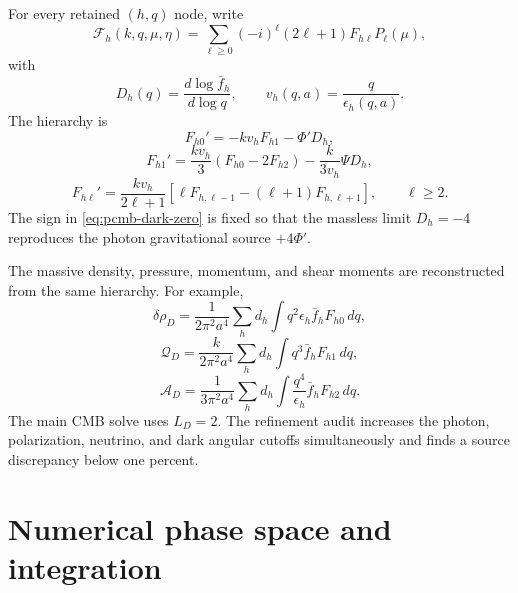 For every retained $(h,q)$ node, write
\begin{equation}
 \mathcal F_h(k,q,\mu,\eta)
 =\sum_{\ell\geq0}(-i)^\ell(2\ell+1)F_{h\ell}P_\ell(\mu),
 \label{eq:pcmb-dark-multipole-expansion}
\end{equation}
with
\begin{equation}
 D_h(q)=\frac{d\log\bar f_h}{d\log q},
 \qquad
 v_h(q,a)=\frac{q}{\epsilon_h(q,a)}.
 \label{eq:pcmb-dark-velocity-slope}
\end{equation}
The hierarchy is
\begin{equation}
 F_{h0}'=-kv_hF_{h1}-\Phi'D_h,
 \label{eq:pcmb-dark-zero}
\end{equation}
\begin{equation}
 F_{h1}'
 =\frac{kv_h}{3}(F_{h0}-2F_{h2})
 -\frac{k}{3v_h}\Psi D_h,
 \label{eq:pcmb-dark-one}
\end{equation}
\begin{equation}
 F_{h\ell}'
 =\frac{kv_h}{2\ell+1}
 \left[\ell F_{h,\ell-1}-(\ell+1)F_{h,\ell+1}\right],
 \qquad \ell\geq2.
 \label{eq:pcmb-dark-general}
\end{equation}
The sign in \eqref{eq:pcmb-dark-zero} is fixed so that the massless limit $D_h=-4$ reproduces the photon gravitational source $+4\Phi'$.

The massive density, pressure, momentum, and shear moments are reconstructed from the same hierarchy.  For example,
\begin{equation}
 \delta\rho_D
 =\frac{1}{2\pi^2a^4}
 \sum_hd_h\int q^2\epsilon_h\bar f_hF_{h0}\,dq,
 \label{eq:pcmb-dark-delta-rho}
\end{equation}
\begin{equation}
 \mathcal Q_D
 =\frac{k}{2\pi^2a^4}
 \sum_hd_h\int q^3\bar f_hF_{h1}\,dq,
 \label{eq:pcmb-dark-momentum}
\end{equation}
\begin{equation}
 \mathcal A_D
 =\frac{1}{3\pi^2a^4}
 \sum_hd_h\int\frac{q^4}{\epsilon_h}\bar f_hF_{h2}\,dq.
 \label{eq:pcmb-dark-shear}
\end{equation}
The main CMB solve uses $L_D=2$.  The refinement audit increases the photon, polarization, neutrino, and dark angular cutoffs simultaneously and finds a source discrepancy below one percent.

\section{Numerical phase space and integration}

